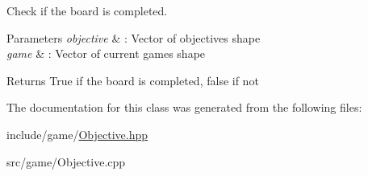Check if the board is completed. 


\begin{DoxyParams}{Parameters}
{\em objective} & \+: Vector of objective\textquotesingle{}s shape \\
\hline
{\em game} & \+: Vector of current game\textquotesingle{}s shape \\
\hline
\end{DoxyParams}
\begin{DoxyReturn}{Returns}
True if the board is completed, false if not 
\end{DoxyReturn}


The documentation for this class was generated from the following files\+:\begin{DoxyCompactItemize}
\item 
include/game/\hyperlink{Objective_8hpp}{Objective.\+hpp}\item 
src/game/Objective.\+cpp\end{DoxyCompactItemize}
